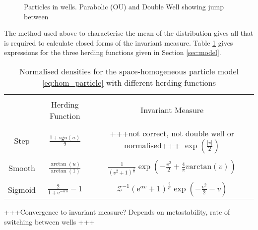 \documentclass[11pt, a4pape draft]{article}
\begin{document}
        \begin{figure}
            \centering
            \caption{Particles in wells. Parabolic (OU) and Double Well showing jump between}
            \label{fig:particle_wells}
        \end{figure}
        
        The method used above to characterise the mean of the distribution gives all that is required to calculate closed forms of the invariant measure. Table \ref{tab:space_particle_inv} gives expressions for the three herding functions given in Section \ref{sec:model}.
        \begin{table}
        \centering
        \begin{tabular}{|c|c|c|}
            \hline 
            & & \\[-0.5em] 
            & Herding Function & Invariant Measure \\[10pt]
            \hline
            & & \\[-0.5em] 
            Step & $\frac{1+\mathrm{sgn}(u)}{2}$ & +++not correct, not double well or normalised+++ $\exp\left(\frac{|v|}{2}\right)$ \\[10pt]
            \hline 
            & & \\[-0.5em]
            Smooth &$\frac{\arctan(u)}{\arctan(1)}$  & $\frac{1}{(v^2+1)^{\frac{2}{\pi}}} \exp\left( -\frac{v^2}{2}+\frac{4}{\pi}v\mathrm{arctan}(v)\right)$ \\[10pt]
            \hline 
            & & \\[-0.5em]
            Sigmoid & $\frac{2}{1+\mathrm{e}^{-\alpha u}} - 1$ & $ \mathcal{Z}^{-1}(\mathrm{e}^{\alpha v}+1)^{\frac{2}{\alpha}}\exp\left(-\frac{v^2}{2} - v\right)$ \\[10pt]
            \hline 
        \end{tabular}
        \caption{Normalised densities for the space-homogeneous particle model \eqref{eq:hom_particle} with different herding functions} 
        \label{tab:space_particle_inv}
        \end{table}
    
        +++Convergence to invariant measure? Depends on metastability, rate of switching between wells +++
     
\end{document}
